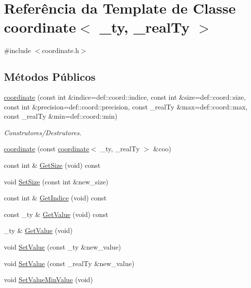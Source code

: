 \hypertarget{classcoordinate}{
\section{Referência da Template de Classe coordinate$<$ \_\-ty, \_\-realTy $>$}
\label{classcoordinate}
}


{\ttfamily \#include $<$coordinate.h$>$}

\subsection*{Métodos Públicos}
\begin{DoxyCompactItemize}
\item 
\hyperlink{classcoordinate_a1c690e9cfa9ce1bff5f1d64eaadd171f}{coordinate} (const int \&indice=def::coord::indice, const int \&size=def::coord::size, const int \&precision=def::coord::precision, const \_\-realTy \&max=def::coord::max, const \_\-realTy \&min=def::coord::min)
\begin{DoxyCompactList}\small\item\em Construtores/Destrutores. \item\end{DoxyCompactList}\item 
\hyperlink{classcoordinate_a52212c2723e16c95a8bc6acce3d6ef4e}{coordinate} (const \hyperlink{classcoordinate}{coordinate}$<$ \_\-ty, \_\-realTy $>$ \&coo)
\item 
const int \& \hyperlink{classcoordinate_a0e3450e6a6a1b4d577886fb68883d61c}{GetSize} (void) const 
\item 
void \hyperlink{classcoordinate_a8dca6b1375bc84a05f66d8694681acbe}{SetSize} (const int \&new\_\-size)
\item 
const int \& \hyperlink{classcoordinate_a617500d91429987c40541973ae80662a}{GetIndice} (void) const 
\item 
const \_\-ty \& \hyperlink{classcoordinate_a67e7c384fd0641455b6629a7d6a9a344}{GetValue} (void) const 
\item 
\_\-ty \& \hyperlink{classcoordinate_a46e04592c97e4d4f10aad3cbe90a7a6a}{GetValue} (void)
\item 
void \hyperlink{classcoordinate_ae66e44d1146ca8020809efe799a5a59c}{SetValue} (const \_\-ty \&new\_\-value)
\item 
void \hyperlink{classcoordinate_a84cb188432f5139c669b8fd3fc0037f5}{SetValue} (const \_\-realTy \&new\_\-value)
\item 
void \hyperlink{classcoordinate_a33a2b235424b34d89e42422c05adc276}{SetValueMinValue} (void)

\end{DoxyCompactItemize}
